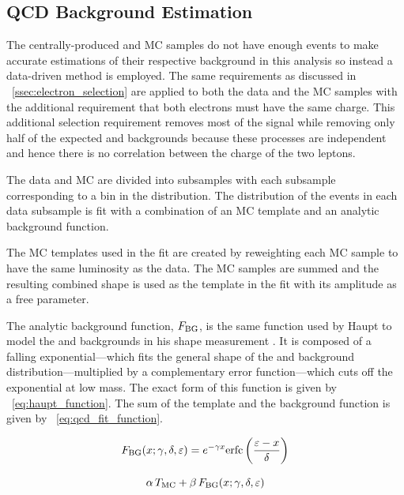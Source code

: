 \subsection{QCD Background Estimation}
\label{ssec:qcd_background}

The centrally-produced \QCDjets and \wjets MC samples do not have enough events
to make accurate estimations of their respective background in this analysis so
instead a data-driven method is employed. The same requirements as discussed in
\SEC~\ref{ssec:electron_selection} are applied to both the data and the MC
samples with the additional requirement that both electrons must have the same
charge. This additional selection requirement removes most of the signal while
removing only half of the expected \QCDjets and \wjets backgrounds because
these processes are independent and hence there is no correlation between the
charge of the two leptons.

The data and MC are divided into subsamples with each subsample corresponding
to a bin in the \phistar distribution. The \mee distribution of the events in
each data subsample is fit with a combination of an MC template and an analytic
background function.

The MC templates used in the fit are created by reweighting each MC sample to
have the same luminosity as the data. The MC samples are summed and the
resulting combined shape is used as the template in the fit with its amplitude
as a free parameter.

The analytic background function, $F_{\text{BG}}$, is the same function used by
Haupt to model the \QCDjets and \wjets backgrounds in his \Ztoee shape
measurement \cite{haupt_2011}. It is composed of a falling exponential---which
fits the general shape of the \QCDjets and \wjets background
distribution---multiplied by a complementary error function---which cuts off
the exponential at low mass. The exact form of this function is given by
\EQ~\ref{eq:haupt_function}. The sum of the template and the background
function is given by \EQ~\ref{eq:qcd_fit_function}.

\begin{equation}\label{eq:haupt_function}
    F_{\text{BG}}(x; \gamma, \delta, \varepsilon) = e^{- \gamma x} {\mathrm{erfc}} \left( \frac{\varepsilon - x}{\delta} \right)
\end{equation}

\begin{equation}\label{eq:qcd_fit_function}
    \alpha \, T_{\text{MC}} + \beta \, F_{\text{BG}}(x; \gamma, \delta, \varepsilon)
\end{equation}

